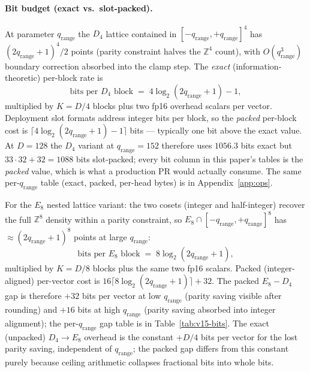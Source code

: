 \documentclass[10pt,a4paper]{article}
\theoremstyle{definition}
\theoremstyle{plain}
\newcommand{\Z}{\mathbb{Z}}
\begin{document}
\paragraph{Bit budget (exact vs.\ slot-packed).}
At parameter $q_\mathrm{range}$ the $D_4$ lattice contained in
$[-q_\mathrm{range},+q_\mathrm{range}]^4$ has
$(2q_\mathrm{range}+1)^4/2$ points (parity constraint halves the
$\Z^4$ count), with $O(q_\mathrm{range}^3)$ boundary correction
absorbed into the clamp step. The \emph{exact} (information-theoretic)
per-block rate is
\begin{equation}
\label{eq:bits-d4}
\text{bits per }D_4\text{ block} \;=\; 4\log_2(2q_\mathrm{range}+1) - 1,
\end{equation}
multiplied by $K = D/4$ blocks plus two fp16 overhead scalars per
vector. Deployment slot formats address integer bits per block, so
the \emph{packed} per-block cost is
$\lceil 4\log_2(2q_\mathrm{range}+1)-1\rceil$ bits --- typically
one bit above the exact value. At $D = 128$ the $D_4$ variant at
$q_\mathrm{range}=152$ therefore uses $1056.3$ bits exact but
$33 \cdot 32 + 32 = 1088$ bits slot-packed; every bit column in
this paper's tables is the \emph{packed} value, which is what a
production PR would actually consume. The same per-$q_\mathrm{range}$
table (exact, packed, per-head bytes) is in
Appendix~\ref{app:ops}.

For the $E_8$ nested lattice variant: the two cosets (integer and
half-integer) recover the full $\Z^8$ density within a parity
constraint, so $E_8 \cap [-q_\mathrm{range},+q_\mathrm{range}]^8$
has $\approx (2q_\mathrm{range}+1)^8$ points at large
$q_\mathrm{range}$:
\begin{equation}
\label{eq:bits-e8}
\text{bits per }E_8\text{ block} \;=\; 8\log_2(2q_\mathrm{range}+1),
\end{equation}
multiplied by $K = D/8$ blocks plus the same two fp16 scalars.
Packed (integer-aligned) per-vector cost is
$16 \lceil 8\log_2(2q_\mathrm{range}+1)\rceil + 32$. The packed
$E_8-D_4$ gap is therefore $+32$ bits per vector at low
$q_\mathrm{range}$ (parity saving visible after rounding) and
$+16$ bits at high $q_\mathrm{range}$ (parity saving absorbed into
integer alignment); the per-$q_\mathrm{range}$ gap table is in
Table~\ref{tab:v15-bits}. The exact (unpacked) $D_4 \to E_8$
overhead is the constant $+D/4$ bits per vector for the lost
parity saving, independent of $q_\mathrm{range}$; the packed gap
differs from this constant purely because ceiling arithmetic
collapses fractional bits into whole bits.
\end{document}
